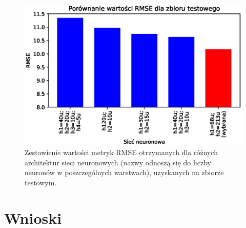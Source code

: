 \documentclass[a4paper,11pt]{article}
\begin{document}
    \bigskip

    \begin{figure}[H]
        \label{fig:compr_rmse}
        \centering
        \includegraphics[width=\textwidth]{compr_rmse}
        \caption{Zestawienie wartości metryk RMSE otrzymanych dla różnych architektur sieci neuronowych (nazwy odnoszą się do liczby neuronów w poszczególnych warstwach), uzyskanych na zbiorze testowym.}
    \end{figure}


    \section{Wnioski}


    \printbibliography
\end{document}
